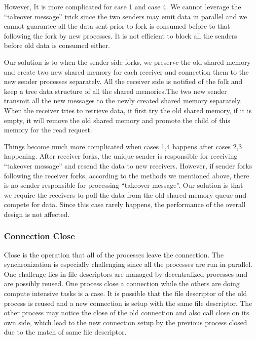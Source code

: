 However, It is more complicated for case 1 and case 4. We cannot leverage the ``takeover message'' trick since the two senders may emit data in parallel and we cannot guarantee all the data sent prior to fork is consumed before to that following the fork by new processes. It is not efficient to block all the senders before old data is consumed either.

Our solution is to when the sender side forks, we preserve the old shared memory and create two new shared memory for each receiver and connection them to the new sender processes separately. All the receiver side is notified of the folk and keep a tree data structure of all the shared memories.The two new sender transmit all the new messages to the newly created shared memory separately. When the receiver tries to retrieve data, it first try the old shared memory, if it is empty, it will remove the old shared memory and promote the child of this memory for the read request. 

Things become much more complicated when cases 1,4 happens after cases 2,3 happening. After receiver forks, the unique sender is responsible for receiving ``takeover message'' and resend the data to new receivers. However, if sender forks following the receiver forks, according to the methods we mentioned above, there is no sender responsible for processing ``takeover message''. Our solution is that we require the receivers to poll the data from the old shared memory queue and compete for data. Since this case rarely happens, the performance of the overall design is not affected.

\subsubsection{Connection Close}

Close is the operation that all of the processes leave the connection. The synchronization is  especially challenging since all the processes are run in parallel. One challenge lies in file descriptors are managed by decentralized processes and are possibly reused. One process close a connection while the others are doing compute intensive tasks is a case. It is possible that the file descriptor of the old process is reused and a new connection is setup with the same file descriptor. The other process may notice the close of the old connection and also call close on its own side, which lead to the new connection setup by the previous process closed due to the match of same file descriptor. 

